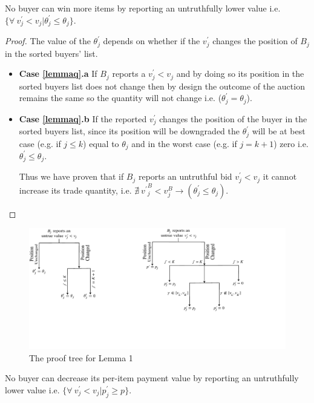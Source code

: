 \begin{Lemma}
\label{lemmaq}
No buyer can win more items by reporting an untruthfully lower value i.e. $\{\forall \ v^\prime_j < v_j | \theta^\prime_{j} \leq \theta_{j} \}$.
\end{Lemma}
\begin{proof}
The value of the $\theta^\prime_j$ depends on whether if the $v^\prime_j$ changes the position of $B_j$ in the sorted buyers' list.
\begin{itemize}
    \item[] \textbf{Case \ref{lemmaq}.a} If $B_j$ reports a $v^\prime_j < v_j$ and by doing so its position in the sorted buyers list does not change then by design the outcome of the auction remains the same so the quantity will not change i.e. (${\theta_{j}^\prime} = \theta_{j}$).
    \item[] \textbf{Case \ref{lemmaq}.b} If the reported $v^\prime_j$ changes the position of the buyer in the sorted buyers list, since its position will be downgraded the $\theta^\prime_{j}$ will be at best case (e.g. if $j \leq k$) equal to $\theta_{j}$ and in the worst case (e.g. if $j=k+1$) zero i.e. ${\theta_{j}^\prime} \leq \theta_{j}$.


Thus we have proven that if $B_j$ reports an untruthful bid $v^\prime_j < v_j$ it cannot increase its trade quantity, i.e. $\nexists \ {{v^\prime}^B_{j} < v^B_{j}}\rightarrow ({\theta_{j}^\prime} \leq \theta_{j})$.
\end{itemize}
\end{proof}
\vspace{-5mm}
\begin{figure}[htbp]
\centering
\includegraphics{Figures/proofq}
\caption{The proof tree for Lemma 1}
\label{fig-proof-q}
\vspace{-2mm}
\end{figure}
\begin{Lemma}
\label{lemma-p}
No buyer can decrease its per-item payment value by reporting an untruthfully lower value i.e. $\{\forall \ v^\prime_j < v_j | p^\prime_{j} \geq p \}$.
\end{Lemma}
